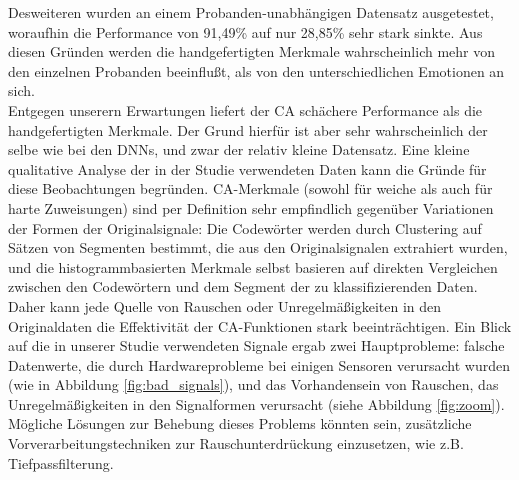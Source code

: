 Desweiteren wurden an einem Probanden-unabhängigen Datensatz ausgetestet, woraufhin die Performance von 91,49\% auf nur 28,85\% sehr stark sinkte.
Aus diesen Gründen werden die handgefertigten Merkmale wahrscheinlich mehr von den einzelnen Probanden beeinflußt, als von den unterschiedlichen Emotionen an sich. \\ 





Entgegen unserern Erwartungen liefert der CA sch{\"a}chere Performance als die handgefertigten Merkmale. 
Der Grund hierf{\"u}r ist aber sehr wahrscheinlich der selbe wie bei den  DNNs, und zwar der relativ kleine Datensatz. 
Eine kleine qualitative Analyse der in der Studie verwendeten Daten kann die Gr{\"u}nde f{\"u}r diese Beobachtungen begr{\"u}nden. 
CA-Merkmale (sowohl f{\"u}r weiche als auch f{\"u}r harte Zuweisungen) sind per Definition sehr empfindlich gegen{\"u}ber Variationen der Formen der Originalsignale: Die Codew{\"o}rter werden durch Clustering auf S{\"a}tzen von Segmenten bestimmt, die aus den Originalsignalen extrahiert wurden, und die histogrammbasierten Merkmale selbst basieren auf direkten Vergleichen zwischen den Codew{\"o}rtern und dem Segment der zu klassifizierenden Daten. 
Daher kann jede Quelle von Rauschen oder Unregelm{\"a}{\ss}igkeiten in den Originaldaten die Effektivit{\"a}t der CA-Funktionen stark beeintr{\"a}chtigen. 
Ein Blick auf die in unserer Studie verwendeten Signale ergab zwei Hauptprobleme: falsche Datenwerte, die durch Hardwareprobleme bei einigen Sensoren verursacht wurden (wie in Abbildung \ref{fig:bad_signals}), und das Vorhandensein von Rauschen, das Unregelm{\"a}{\ss}igkeiten in den Signalformen verursacht (siehe Abbildung \ref{fig:zoom}). M{\"o}gliche L{\"o}sungen zur Behebung dieses Problems k{\"o}nnten sein, zus{\"a}tzliche Vorverarbeitungstechniken zur Rauschunterdr{\"u}ckung einzusetzen, wie z.B. Tiefpassfilterung. \\


